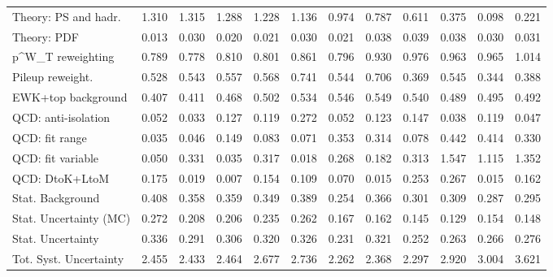 \begin{tabular}{l|p{0.6cm}p{0.6cm}p{0.6cm}p{0.6cm}p{0.6cm}p{0.6cm}p{0.6cm}p{0.6cm}p{0.6cm}p{0.6cm}p{0.6cm}}
Theory: PS and hadr.                     & 1.310 & 1.315 & 1.288 & 1.228 & 1.136 & 0.974 & 0.787 & 0.611 & 0.375 & 0.098 & 0.221 \\
Theory: PDF                              & 0.013 & 0.030 & 0.020 & 0.021 & 0.030 & 0.021 & 0.038 & 0.039 & 0.038 & 0.030 & 0.031 \\
p^{W}_{T} reweighting                    & 0.789 & 0.778 & 0.810 & 0.801 & 0.861 & 0.796 & 0.930 & 0.976 & 0.963 & 0.965 & 1.014 \\
Pileup reweight.                         & 0.528 & 0.543 & 0.557 & 0.568 & 0.741 & 0.544 & 0.706 & 0.369 & 0.545 & 0.344 & 0.388 \\
EWK+top background                       & 0.407 & 0.411 & 0.468 & 0.502 & 0.534 & 0.546 & 0.549 & 0.540 & 0.489 & 0.495 & 0.492 \\
QCD: anti-isolation                      & 0.052 & 0.033 & 0.127 & 0.119 & 0.272 & 0.052 & 0.123 & 0.147 & 0.038 & 0.119 & 0.047 \\
QCD: fit range                           & 0.035 & 0.046 & 0.149 & 0.083 & 0.071 & 0.353 & 0.314 & 0.078 & 0.442 & 0.414 & 0.330 \\
QCD: fit variable                        & 0.050 & 0.331 & 0.035 & 0.317 & 0.018 & 0.268 & 0.182 & 0.313 & 1.547 & 1.115 & 1.352 \\
QCD: DtoK+LtoM                           & 0.175 & 0.019 & 0.007 & 0.154 & 0.109 & 0.070 & 0.015 & 0.253 & 0.267 & 0.015 & 0.162 \\
Stat. Background                         & 0.408 & 0.358 & 0.359 & 0.349 & 0.389 & 0.254 & 0.366 & 0.301 & 0.309 & 0.287 & 0.295 \\
Stat. Uncertainty (MC)                   & 0.272 & 0.208 & 0.206 & 0.235 & 0.262 & 0.167 & 0.162 & 0.145 & 0.129 & 0.154 & 0.148 \\
\hline
Stat. Uncertainty                        & 0.336 & 0.291 & 0.306 & 0.320 & 0.326 & 0.231 & 0.321 & 0.252 & 0.263 & 0.266 & 0.276 \\
\hline
Tot. Syst. Uncertainty                   & 2.455 & 2.433 & 2.464 & 2.677 & 2.736 & 2.262 & 2.368 & 2.297 & 2.920 & 3.004 & 3.621 \\
\hline
\end{tabular}

